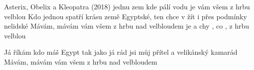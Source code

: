 \begin{TEXT}{Asterix, Obelix a Kleopatra (2018)}
\SLOKA {} jednu zem kde  pálí  
 vodu  je  
  vám všem z hrbu  velblou 
\SLOKA Kdo jednou spatří krásu země Egyptské,
ten chce v žít i přes podmínky nelidské
Mávám, mávám vám všem z hrbu nad velbloudem
\REFREN {}  
je  a chy , co 
,    z hrbu  velblou 

\SLOKA Já říkám kdo máš Egypt tak jako já rád
jsi můj přítel a velikánský kamarád
Mávám, mávám vám všem z hrbu nad velbloudem
\REFRENHRAJ
\end{TEXT}